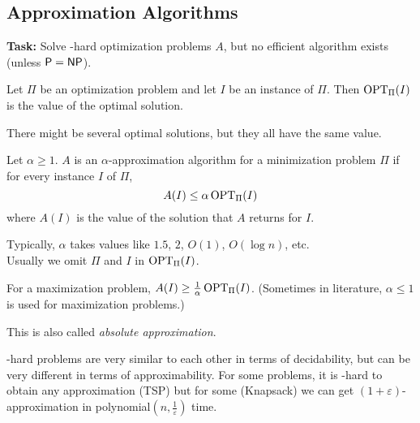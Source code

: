 \subsection{Approximation Algorithms} \label{sec:approx}
\textbf{Task:} Solve \NP-hard optimization problems $A$, but no efficient
algorithm exists (unless $\mathsf{P} = \mathsf{NP}$).
\begin{definition}
    Let $\Pi$ be an optimization problem and let $I$ be an instance of $\Pi$.
    Then $\operatorname{OPT}_\Pi(I)$ is the value of the optimal solution.
\end{definition}
There might be several optimal solutions, but they all have the same value.
\begin{definition}
    Let $\alpha \ge 1$.
    $A$ is an $\alpha$-approximation algorithm for a minimization problem $\Pi$
    if for every instance $I$ of $\Pi$, \[
        A(I) \le \alpha \operatorname{OPT}_\Pi(I)
    \] where $A(I)$ is the value of the solution that $A$ returns for $I$.
\end{definition}
Typically, $\alpha$ takes values like $1.5$, $2$, $O(1)$, $O(\log n)$, etc. \\
Usually we omit $\Pi$ and $I$ in $\operatorname{OPT}_\Pi(I)$.

For a maximization problem, $A(I) \ge \frac1\alpha \operatorname{OPT}_\Pi(I)$.
(Sometimes in literature, $\alpha \le 1$ is used for maximization problems.)

This is also called \emph{absolute approximation}.

\NP-hard problems are very similar to each other in terms of decidability, but
can be very different in terms of approximability.
For some problems, it is \NP-hard to obtain any approximation (TSP) but for some
(Knapsack) we can get $(1+\varepsilon)$-approximation in
polynomial$(n, \frac1\varepsilon)$ time.

